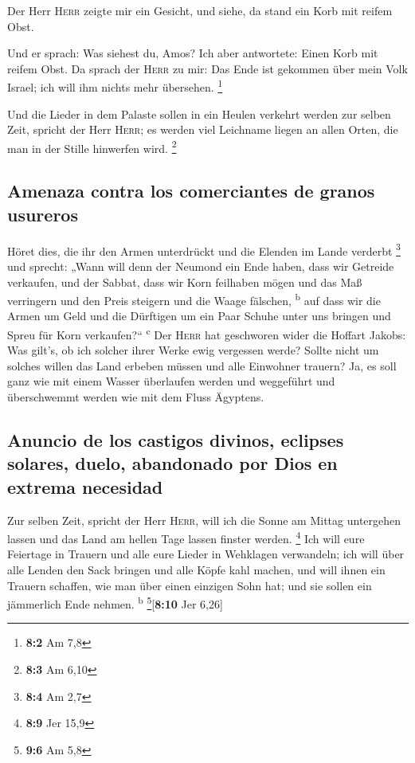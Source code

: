  Der Herr \textsc{Herr} zeigte mir ein Gesicht, und siehe,
da stand ein Korb mit reifem Obst.

 Und er sprach: Was siehest du, Amos? Ich aber antwortete:
Einen Korb mit reifem Obst. Da sprach der \textsc{Herr} zu mir: Das Ende
ist gekommen über mein Volk Israel; ich will ihm nichts mehr übersehen.
\footnote{\textbf{8:2} Am 7,8}

 Und die Lieder in dem Palaste sollen in ein Heulen
verkehrt werden zur selben Zeit, spricht der Herr \textsc{Herr}; es
werden viel Leichname liegen an allen Orten, die man in der Stille
hinwerfen wird. \footnote{\textbf{8:3} Am 6,10}

\hypertarget{amenaza-contra-los-comerciantes-de-granos-usureros}{%
\subsection{Amenaza contra los comerciantes de granos
usureros}\label{amenaza-contra-los-comerciantes-de-granos-usureros}}

 Höret dies, die ihr den Armen unterdrückt und die Elenden
im Lande verderbt \footnote{\textbf{8:4} Am 2,7}  und
sprecht: „Wann will denn der Neumond ein Ende haben, dass wir Getreide
verkaufen, und der Sabbat, dass wir Korn feilhaben mögen und das Maß
verringern und den Preis steigern und die Waage fälschen,
\textsuperscript{b}  auf dass wir die Armen um Geld und
die Dürftigen um ein Paar Schuhe unter uns bringen und Spreu für Korn
verkaufen?{}`` \textsuperscript{c}  Der \textsc{Herr} hat
geschworen wider die Hoffart Jakobs: Was gilt's, ob ich solcher ihrer
Werke ewig vergessen werde?  Sollte nicht um solches
willen das Land erbeben müssen und alle Einwohner trauern? Ja, es soll
ganz wie mit einem Wasser überlaufen werden und weggeführt und
überschwemmt werden wie mit dem Fluss Ägyptens.

\hypertarget{anuncio-de-los-castigos-divinos-eclipses-solares-duelo-abandonado-por-dios-en-extrema-necesidad}{%
\subsection{Anuncio de los castigos divinos, eclipses solares, duelo,
abandonado por Dios en extrema
necesidad}\label{anuncio-de-los-castigos-divinos-eclipses-solares-duelo-abandonado-por-dios-en-extrema-necesidad}}

 Zur selben Zeit, spricht der Herr \textsc{Herr}, will ich
die Sonne am Mittag untergehen lassen und das Land am hellen Tage lassen
finster werden. \footnote{\textbf{8:9} Jer 15,9}  Ich
will eure Feiertage in Trauern und alle eure Lieder in Wehklagen
verwandeln; ich will über alle Lenden den Sack bringen und alle Köpfe
kahl machen, und will ihnen ein Trauern schaffen, wie man über einen
einzigen Sohn hat; und sie sollen ein jämmerlich Ende nehmen.
\textsuperscript{b} \footnote{\textbf{9:6} Am 5,8}{[}\textbf{8:10} Jer
6,26{]}

